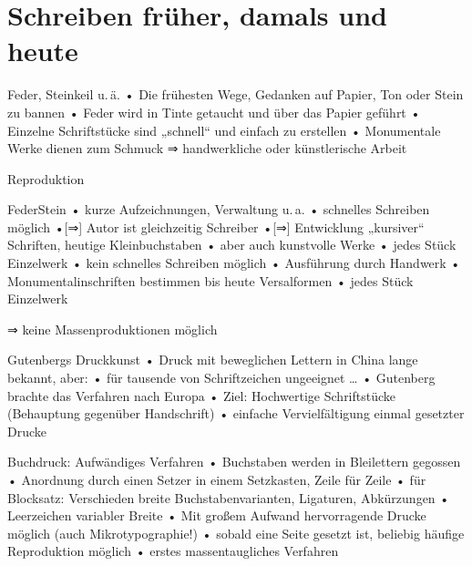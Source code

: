 

\usepackage{epic}
\graphicspath{{../Mediales/}}


\section{Schreiben früher, damals und heute}
\begin{frame}{Feder, Steinkeil u.\,ä.}
• Die frühesten Wege, Gedanken auf Papier, Ton oder Stein zu bannen
• Feder wird in Tinte getaucht und über das Papier geführt
• Einzelne Schriftstücke sind „schnell“ und einfach zu erstellen
• Monumentale Werke dienen zum Schmuck ⇒ handwerkliche oder künstlerische Arbeit
\•
\end{frame}

\begin{frame}{Reproduktion}
\begin{twoblock}{Feder}{Stein}
• kurze Aufzeichnungen, Verwaltung u.\,a.
• schnelles Schreiben möglich
•[⇒] Autor ist gleichzeitig Schreiber
•[⇒] Entwicklung „kursiver“ Schriften, heutige Kleinbuchstaben
• aber auch kunstvolle Werke
• jedes Stück Einzelwerk
\•
\nextblock
• kein schnelles Schreiben möglich
• Ausführung durch Handwerk
• Monumentalinschriften bestimmen bis heute Versalformen
• jedes Stück Einzelwerk
\•
\end{twoblock}
\vspace*{1em}
⇒ keine Massenproduktionen möglich
\end{frame}

\begin{frame}{Gutenbergs Druckkunst}
• Druck mit beweglichen Lettern in China lange bekannt, aber:
• für tausende von Schriftzeichen ungeeignet …
• Gutenberg brachte das Verfahren nach Europa
• Ziel: Hochwertige Schriftstücke (Behauptung gegenüber Handschrift)
• einfache Vervielfältigung einmal gesetzter Drucke
\• 
\end{frame}

\begin{frame}{Buchdruck: Aufwändiges Verfahren}
• Buchstaben werden in Bleilettern gegossen
• Anordnung durch einen Setzer in einem Setzkasten, Zeile für Zeile
• für Blocksatz: Verschieden breite Buchstabenvarianten, Ligaturen, Abkürzungen
• Leerzeichen variabler Breite
• Mit großem Aufwand hervorragende Drucke möglich (auch Mikrotypographie!)
• sobald eine Seite gesetzt ist, beliebig häufige Reproduktion möglich
• erstes massentaugliches Verfahren
\•
\end{frame}

